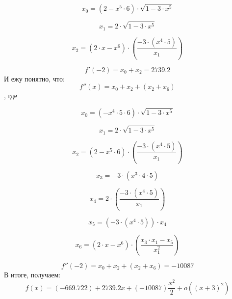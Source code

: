 \documentclass[12pt,a4paper,fleqn]{article}
\begin{document}
$$
x_{0} = \left(2- x^{5}\cdot6\right)\cdot\sqrt{1-3\cdot x^{5}}
$$

$$
x_{1} = 2\cdot\sqrt{1-3\cdot x^{5}}
$$

$$
x_{2} = \left(2\cdot x- x^{6}\right)\cdot\left(\frac{-3\cdot\left( x^{4}\cdot5\right)}{ x_{1}}\right)
$$

$$
f'(-2)= x_{0}+ x_{2}=2739.2
$$
И ежу понятно, что:
$$
f''(x)= x_{0}+ x_{2}+\left( x_{2}+ x_{6}\right)
$$
, где

$$
x_{0} = \left(- x^{4}\cdot5\cdot6\right)\cdot\sqrt{1-3\cdot x^{5}}
$$

$$
x_{1} = 2\cdot\sqrt{1-3\cdot x^{5}}
$$

$$
x_{2} = \left(2- x^{5}\cdot6\right)\cdot\left(\frac{-3\cdot\left( x^{4}\cdot5\right)}{ x_{1}}\right)
$$

$$
x_{3} = -3\cdot\left( x^{3}\cdot4\cdot5\right)
$$

$$
x_{4} = 2\cdot\left(\frac{-3\cdot\left( x^{4}\cdot5\right)}{ x_{1}}\right)
$$

$$
x_{5} = \left(-3\cdot\left( x^{4}\cdot5\right)\right)\cdot x_{4}
$$

$$
x_{6} = \left(2\cdot x- x^{6}\right)\cdot\left(\frac{ x_{3}\cdot x_{1}- x_{5}}{ x_{1}^{2}}\right)
$$

$$
f''(-2)= x_{0}+ x_{2}+\left( x_{2}+ x_{6}\right)=-10087
$$
В итоге, получаем:
$$
f(x)=(-669.722)+2739.2x+(-10087)\frac{x^2}{2}+o((x+3)^{2})
$$
\end{document}
